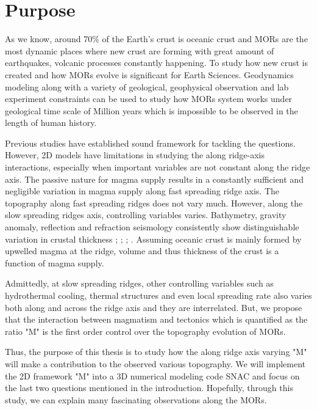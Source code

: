 \documentclass[12pt]{article}
\begin{document}
\break
\section{Purpose}
\label{ch:purpose}
As we know, around 70\% of the Earth's crust is oceanic crust and MORs are the most dynamic places where new crust are forming with great amount of earthquakes, volcanic processes constantly happening. To study how new crust is created and how MORs evolve is significant for Earth Sciences. Geodynamics modeling along with a variety of geological, geophysical observation and lab experiment constraints can be used to study how MORs system works under geological time scale of Million years which is impossible to be observed in the length of human history.

Previous studies have established sound framework for tackling the questions. However, 2D models have limitations in studying the along ridge-axis interactions, especially when important variables are not constant along the ridge axis. The passive nature for magma supply results in a constantly sufficient and negligible variation in magma supply along fast spreading ridge axis. The topography along fast spreading ridges does not vary much. However, along the slow spreading ridges axis, controlling variables varies. Bathymetry, gravity anomaly, reflection and refraction seismology consistently show distinguishable variation in crustal thickness \citep{Ryan2009}; \citep{Chen1999}; \citep{Lin1990}; \citep{Tolstoy1993}. Assuming oceanic crust is mainly formed by upwelled magma at the ridge, volume and thus thickness of the crust is a function of magma supply.

Admittedly, at slow spreading ridges, other controlling variables such as hydrothermal cooling, thermal structures and even local spreading rate \citep{Baines2008} also varies both along and across the ridge axis and they are interrelated. But, we propose that the interaction between magmatism and tectonics which is quantified as the ratio "M" is the first order control over the topography evolution of MORs. 

Thus, the purpose of this thesis is to study how the along ridge axis varying "M" will make a contribution to the observed various topography. We will implement the 2D framework "M" into a 3D numerical modeling code SNAC \citep{Choi2008} and focus on the last two questions mentioned in the introduction. Hopefully, through this study, we can explain many fascinating observations along the MORs.
\end{document}
